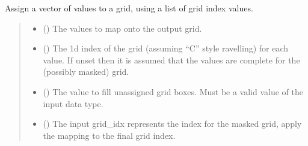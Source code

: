 \documentclass[letterpaper,10pt,english]{sphinxmanual}
\begin{document}
\begin{fulllineitems}
\begin{fulllineitems}
\begin{quote}
\begin{description}
\sphinxAtStartPar
{}

\end{description}\end{quote}

\end{fulllineitems}


\begin{fulllineitems}
\label{\detokenize{grid:glomar_gridding.grid.Grid.assign_values}}
\pysigstartsignatures
\pysiglinewithargsret
{}
{\sphinxparamcomma {}\sphinxparamcomma {}\sphinxparamcomma {}}
{}
\pysigstopsignatures
\sphinxAtStartPar
Assign a vector of values to a grid, using a list of grid index values.
\begin{quote}\begin{description}
\begin{itemize}
\item {}
\sphinxAtStartPar
{} () \textendash{} The values to map onto the output grid.

\item {}
\sphinxAtStartPar
{} (\sphinxstyleliteralemphasis{\sphinxupquote{ | }}) \textendash{} The 1d index of the grid (assuming “C” style ravelling) for each
value. If unset then it is assumed that the values are complete for
the (possibly masked) grid.

\item {}
\sphinxAtStartPar
{} () \textendash{} The value to fill unassigned grid boxes. Must be a valid value of
the input  data type.

\item {}
\sphinxAtStartPar
{} () \textendash{} The input grid\_idx represents the index for the masked grid, apply
the mapping to the final grid index.


\end{itemize}
\end{description}
\end{quote}
\end{fulllineitems}
\end{fulllineitems}
\end{document}
